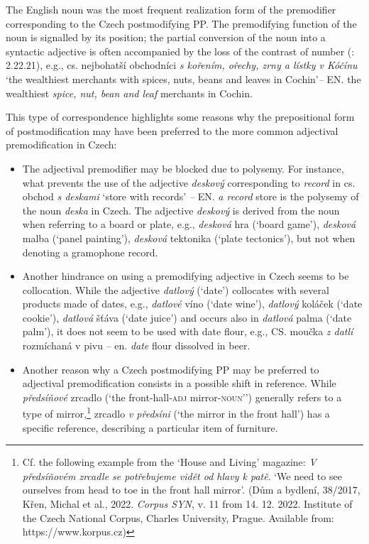 \documentclass[output=paper]{langscibook}
\begin{document}
The English noun was the most frequent realization form of the premodifier corresponding to the Czech postmodifying PP. The premodifying function of the noun is signalled by its position; the partial conversion of the noun into a syntactic adjective is often accompanied by the loss of the contrast of number (\citealt{DuškováEtAl2009}: 2.22.21), e.g., cs. nejbohatší obchodníci \textit{s kořením, ořechy, zrny a lístky v Kóčínu} ‘the wealthiest merchants with spices, nuts, beans and leaves in Cochin’\textit{–} EN. the wealthiest \textit{spice, nut, bean and leaf} merchants in Cochin.

\newpage
This type of correspondence highlights some reasons why the prepositional form of postmodification may have been preferred to the more common adjectival premodification in Czech:

\begin{itemize}
\item  The adjectival premodifier may be blocked due to polysemy. For instance, what prevents the use of the adjective \textit{deskový} corresponding to \textit{record} in cs. obchod \textit{s deskami} ‘store with records’ \textit{–} EN. \textit{a record} store is the polysemy of the noun \textit{deska} in Czech. The adjective \textit{deskový} is derived from the noun when referring to a board or plate, e.g., \textit{desková} hra (‘board game’), \textit{desková} malba (‘panel painting’), \textit{desková} tektonika (‘plate tectonics’), but not when denoting a gramophone record.
\item  Another hindrance on using a premodifying adjective in Czech seems to be collocation. While the adjective \textit{datlový} (‘date’) collocates with several products made of dates, e.g., \textit{datlové} víno (‘date wine’), \textit{datlový} koláček (‘date cookie’), \textit{datlová} šťáva (‘date juice’) and occurs also in \textit{datlová} palma (‘date palm’), it does not seem to be used with date flour, e.g., CS. moučka \textit{z datlí} rozmíchaná v pivu – en. \textit{date} flour dissolved in beer.
\item  Another reason why a Czech postmodifying PP may be preferred to adjectival premodification consists in a possible shift in reference. While \textit{předsíňové} zrcadlo (‘the front-hall-\textsc{adj} mirror-\textsc{noun}’’) generally refers to a type of mirror,\footnote{Cf. the following example from the ‘House and Living’ magazine: \textit{V předsíňovém zrcadle se potřebujeme vidět od hlavy k patě}. ‘We need to see ourselves from head to toe in the front hall mirror’. (Dům a bydlení, 38/2017, Křen, Michal et al., 2022. \textit{Corpus SYN}, v. 11 from 14. 12. 2022. Institute of the Czech National Corpus, Charles University, Prague. Available from: https://www.korpus.cz)} zrcadlo \textit{v předsíni} (‘the mirror in the front hall’) has a specific reference, describing a particular item of furniture.

\end{itemize}
\end{document}
